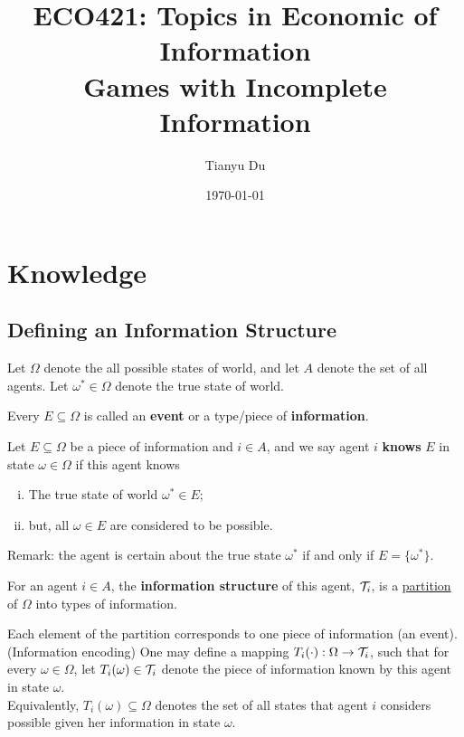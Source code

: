 \documentclass{article}
\title{ECO421: Topics in Economic of Information \\ \large Games with Incomplete Information}
\date{\today}
\author{Tianyu Du}
\begin{document}
    \maketitle
    \tableofcontents
    \newpage
    
    \section{Knowledge}
    \subsection{Defining an Information Structure}
    \begin{notation}
    	Let $\Omega$ denote the all possible states of world, and let $A$ denote the set of all agents. Let $\omega^* \in \Omega$ denote the true state of world.
    \end{notation}
	
	\begin{definition}
		Every $E \subseteq \Omega$ is called an \textbf{event} or a type/piece of \textbf{information}.
	\end{definition}
	
    \begin{definition}
    	Let $E \subseteq \Omega$ be a piece of information and $i \in A$, and we say agent $i$ \textbf{knows} $E$ in state $\omega \in \Omega$ if this agent knows
    	\begin{enumerate}[(i)]
    		\item The true state of world $\omega^* \in E$;
    		\item but, all $\omega \in E$ are considered to be possible.
    	\end{enumerate}
    	Remark: the agent is certain about the true state $\omega^*$ if and only if $E = \{\omega^*\}$.
    \end{definition}
    
    \begin{definition}
    	For an agent $i \in A$, the \textbf{information structure} of this agent, $\mathcal{{T}}_i$, is a \ul{partition} of $\Omega$ into types of information.
    \end{definition}
    
    \begin{notation}
    	Each element of the partition corresponds to one piece of information (an event). \\
    	(Information encoding) One may define a mapping $T_i(\cdot): \Omega \to \mathcal{{T}}_i$, such that for every $\omega \in \Omega$, let $T_i(\omega) \in \mathcal{{T}}_i$ denote the piece of information known by this agent in state $\omega$. \\
    	Equivalently, $T_i(\omega) \subseteq \Omega$ denotes the set of all states that agent $i$ considers possible given her information in state $\omega$.
    \end{notation}
    
\end{document}
